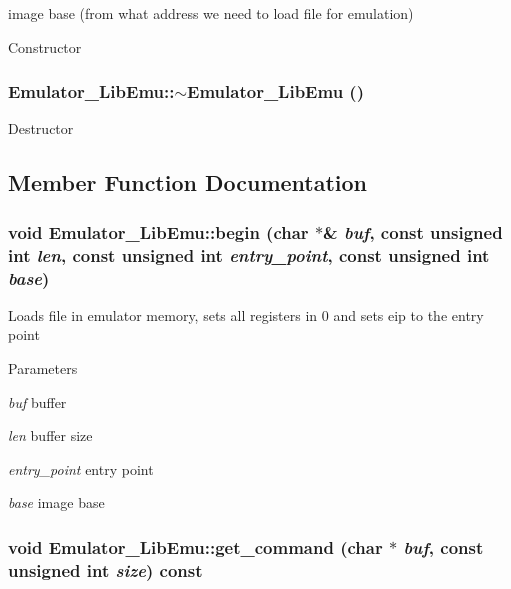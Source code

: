 image base (from what address we need to load file for emulation) 

Constructor \hypertarget{classEmulator__LibEmu_a358ea52a971cbb5e14b6e08bcbaa29fb}{
\subsubsection[{$\sim$Emulator\_\-LibEmu}]{\setlength{\rightskip}{0pt plus 5cm}Emulator\_\-LibEmu::$\sim$Emulator\_\-LibEmu ()}}
\label{classEmulator__LibEmu_a358ea52a971cbb5e14b6e08bcbaa29fb}
Destructor 

\subsection{Member Function Documentation}
\hypertarget{classEmulator__LibEmu_af64acac5abd8f8c2e48ea8ac8e6a3a28}{
\subsubsection[{begin}]{\setlength{\rightskip}{0pt plus 5cm}void Emulator\_\-LibEmu::begin (char $\ast$\& {\em buf}, \/  const unsigned int {\em len}, \/  const unsigned int {\em entry\_\-point}, \/  const unsigned int {\em base})}}
\label{classEmulator__LibEmu_af64acac5abd8f8c2e48ea8ac8e6a3a28}
Loads file in emulator memory, sets all registers in 0 and sets eip to the entry point 
\begin{DoxyParams}{Parameters}
\item[{\em buf}]buffer \item[{\em len}]buffer size \item[{\em entry\_\-point}]entry point \item[{\em base}]image base \end{DoxyParams}
\hypertarget{classEmulator__LibEmu_a8779c16bb5b588252c0d2d048c7954c5}{
\subsubsection[{get\_\-command}]{\setlength{\rightskip}{0pt plus 5cm}void Emulator\_\-LibEmu::get\_\-command (char $\ast$ {\em buf}, \/  const unsigned int {\em size}) const}}
